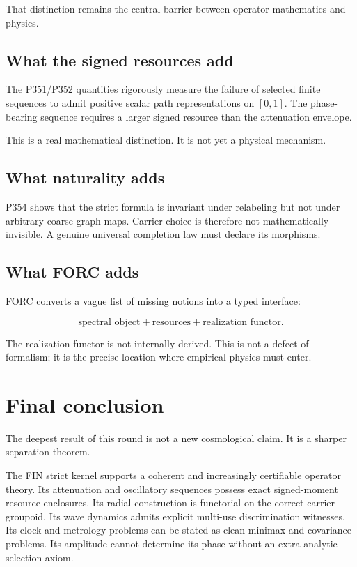 \documentclass[11pt,a4paper,openany]{report}
\begin{document}
That distinction remains the central barrier between operator mathematics and physics.

\section{What the signed resources add}

The P351/\allowbreak{}P352 quantities rigorously measure the failure of selected finite sequences to admit positive scalar path representations on \([0,1]\). The phase-bearing sequence requires a larger signed resource than the attenuation envelope.

This is a real mathematical distinction. It is not yet a physical mechanism.

\section{What naturality adds}

P354 shows that the strict formula is invariant under relabeling but not under arbitrary coarse graph maps. Carrier choice is therefore not mathematically invisible. A genuine universal completion law must declare its morphisms.

\section{What FORC adds}

FORC converts a vague list of missing notions into a typed interface:

\[
\text{spectral object}
+\text{resources}
+\text{realization functor}.
\]

The realization functor is not internally derived. This is not a defect of formalism; it is the precise location where empirical physics must enter.

\chapter{Final conclusion}

The deepest result of this round is not a new cosmological claim. It is a sharper separation theorem.

The FIN strict kernel supports a coherent and increasingly certifiable operator theory. Its attenuation and oscillatory sequences possess exact signed-moment resource enclosures. Its radial construction is functorial on the correct carrier groupoid. Its wave dynamics admits explicit multi-use discrimination witnesses. Its clock and metrology problems can be stated as clean minimax and covariance problems. Its amplitude cannot determine its phase without an extra analytic selection axiom.
\end{document}
